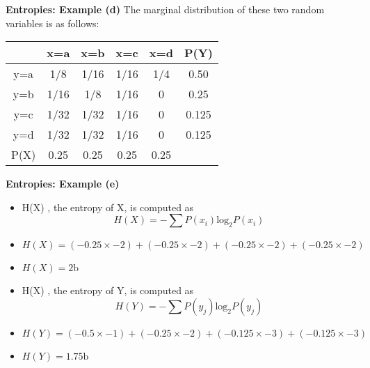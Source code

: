 \documentclass[a4]{beamer}
\begin{document}
\noindent \textbf{Entropies: Example (d)}
The marginal distribution of these two random variables is as follows:\\ \bigskip
\begin{center}
\begin{tabular}{|c|c|c|c|c||c|}
\hline
&x=a& x=b & x=c & x=d &\alert{P(Y)}\\ \hline
y=a &1/8 &1/16 &1/16 &1/4 & \alert{0.50}\\ \hline
y=b &1/16 & 1/8& 1/16& 0 & \alert{0.25}\\ \hline
y=c & 1/32&1/32 & 1/16 & 0& \alert{0.125}\\ \hline
y=d & 1/32& 1/32& 1/16 & 0& \alert{0.125}\\ \hline \hline
\alert{P(X)} & \alert{0.25}& \alert{0.25}& \alert{0.25} & \alert{0.25}&\\ \hline
\end{tabular}
\end{center}




\noindent \textbf{Entropies: Example (e)}
\begin{itemize}

\item H(X) , the entropy of X, is computed as\\
 \[H(X) = -\sum P(x_i) \mbox{log}_2P(x_i)\] \item $H(X) =  (-0.25 \times -2) + (-0.25 \times -2) +(-0.25 \times -2) +(-0.25 \times -2)$\item $ H(X) = 2 \mbox{b}$ \bigskip

\item H(X) , the entropy of Y, is computed as\\
 \[H(Y) = -\sum P(y_j) \mbox{log}_2P(y_j)\] \item $H(Y) =  (-0.5 \times -1) +(-0.25 \times -2)  + (-0.125 \times -3)  +(-0.125 \times -3)$\item $ H(Y) = 1.75 \mbox{b}$



\end{itemize}
\end{document}
